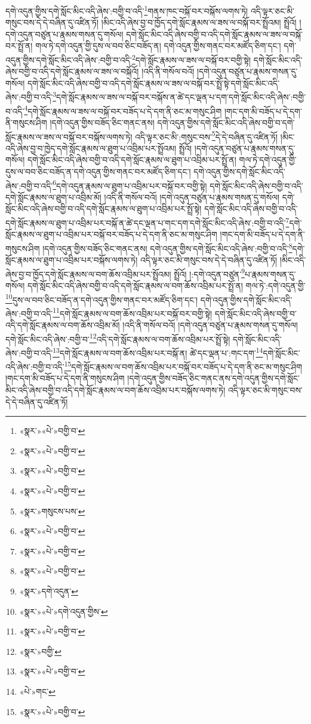 དགེ་འདུན་གྱིས་དགེ་སློང་མིང་འདི་ཞེས་:བགྱི་བ་འདི་\footnote{«སྣར་»«པེ་»བགྱི་བ་}གནས་ཁང་བསྐོ་བར་བསྐོས་ལགས་ཏེ། འདི་ལྟར་ཅང་མི་གསུང་བས་དེ་དེ་བཞིན་དུ་འཛིན་ཏོ། །མིང་འདི་ཞེས་བྱ་བ་ཁྱོད་དགེ་སློང་རྣམས་ལ་ཟས་ལ་བསྐོ་བར་སྤྲོའམ། སྤྲོའོ། །དགེ་འདུན་བཙུན་པ་རྣམས་གསན་དུ་གསོལ། དགེ་སློང་མིང་འདི་ཞེས་བགྱི་བ་འདི་དགེ་སློང་རྣམས་ལ་ཟས་ལ་བསྐོ་བར་སྤྲོ་ན། གལ་ཏེ་དགེ་འདུན་གྱི་དུས་ལ་བབ་ཅིང་བཟོད་ན། དགེ་འདུན་གྱིས་གནང་བར་མཛོད་ཅིག་དང་། དགེ་འདུན་གྱིས་དགེ་སློང་མིང་འདི་ཞེས་:བགྱི་བ་འདི་\footnote{«སྣར་»«པེ་»བགྱི་བ་}དགེ་སློང་རྣམས་ལ་ཟས་ལ་བསྐོ་བར་བགྱི་སྟེ། དགེ་སློང་མིང་འདི་ཞེས་བགྱི་བ་འདི་དགེ་སློང་རྣམས་ལ་ཟས་ལ་བསྐོའོ། །འདི་ནི་གསོལ་བའོ། །དགེ་འདུན་བཙུན་པ་རྣམས་གསན་དུ་གསོལ། དགེ་སློང་མིང་འདི་ཞེས་བགྱི་བ་འདི་དགེ་སློང་རྣམས་ལ་ཟས་ལ་བསྐོ་བར་སྤྲོ་སྟེ་དགེ་སློང་མིང་འདི་ཞེས་:བགྱི་བ་འདི་\footnote{«སྣར་»«པེ་»བགྱི་བ་}དགེ་སློང་རྣམས་ལ་ཟས་ལ་བསྐོ་བར་བསྐོས་ན་ཚེ་དང་ལྡན་པ་དག་དགེ་སློང་མིང་འདི་ཞེས་:བགྱི་བ་འདི་\footnote{«སྣར་»«པེ་»བགྱི་བ་}དགེ་སློང་རྣམས་ལ་ཟས་ལ་བསྐོ་བར་བཟོད་པ་དེ་དག་ནི་ཅང་མ་གསུང་ཤིག །གང་དག་མི་བཟོད་པ་དེ་དག་ནི་གསུངས་ཤིག །དགེ་འདུན་གྱིས་བཟོད་ཅིང་གནང་ནས། དགེ་འདུན་གྱིས་དགེ་སློང་མིང་འདི་ཞེས་བགྱི་བ་དགེ་སློང་རྣམས་ལ་ཟས་ལ་བསྐོ་བར་བསྐོས་ལགས་ཏེ། འདི་ལྟར་ཅང་མི་:གསུང་བས་\footnote{«སྣར་»གསུངས་པས་}དེ་དེ་བཞིན་དུ་འཛིན་ཏོ། །མིང་འདི་ཞེས་བྱ་བ་ཁྱེད་དགེ་སློང་རྣམས་ལ་ཐུག་པ་འབྲིམ་པར་སྤྲོའམ། སྤྲོའོ། །དགེ་འདུན་བཙུན་པ་རྣམས་གསན་དུ་གསོལ། དགེ་སློང་མིང་འདི་ཞེས་བགྱི་བ་འདི་དགེ་སློང་རྣམས་ལ་ཐུག་པ་འབྲིམ་པར་སྤྲོ་ན། གལ་ཏེ་དགེ་འདུན་གྱི་དུས་ལ་བབ་ཅིང་བཟོད་ན་དགེ་འདུན་གྱིས་གནང་བར་མཛོད་ཅིག་དང་། དགེ་འདུན་གྱིས་དགེ་སློང་མིང་འདི་ཞེས་:བགྱི་བ་འདི་\footnote{«སྣར་»«པེ་»བགྱི་བ་}དགེ་འདུན་རྣམས་ལ་ཐུག་པ་འབྲིམ་པར་བསྐོ་བར་བགྱི་སྟེ། དགེ་སློང་མིང་འདི་ཞེས་བགྱི་བ་འདི་དགེ་སློང་རྣམས་ལ་ཐུག་པ་འབྲིམ་མོ། །འདི་ནི་གསོལ་བའོ། །དགེ་འདུན་བཙུན་པ་རྣམས་གསན་དུ་གསོལ། དགེ་སློང་མིང་འདི་ཞེས་བགྱི་བ་འདི་དགེ་སློང་རྣམས་ལ་ཐུག་པ་འབྲིམ་པར་སྤྲོ་སྟེ། དགེ་སློང་མིང་འདི་ཞེས་བགྱི་བ་འདི་དགེ་སློང་རྣམས་ལ་ཐུག་པ་འབྲིམ་པར་བསྐོ་ན་ཚེ་དང་ལྡན་པ་གང་དག་དགེ་སློང་མིང་འདི་ཞེས་:བགྱི་བ་འདི་\footnote{«སྣར་»«པེ་»བགྱི་བ་}དགེ་སློང་རྣམས་ལ་ཐུག་པ་འབྲིམ་པར་བསྐོ་བར་བཟོད་པ་དེ་དག་ནི་ཅང་མ་གསུང་ཤིག །གང་དག་མི་བཟོད་པ་དེ་དག་ནི་གསུངས་ཤིག །དགེ་འདུན་གྱིས་བཟོད་ཅིང་གནང་ནས། དགེ་འདུན་གྱིས་དགེ་སློང་མིང་འདི་ཞེས་:བགྱི་བ་འདི་\footnote{«སྣར་»«པེ་»བགྱི་བ་}དགེ་སློང་རྣམས་ལ་ཐུག་པ་འབྲིམ་པར་བསྐོས་ལགས་ཏེ། འདི་ལྟར་ཅང་མི་གསུང་བས་དེ་དེ་བཞིན་དུ་འཛིན་ཏོ། །མིང་འདི་ཞེས་བྱ་བ་ཁྱོད་དགེ་སློང་རྣམས་ལ་བག་ཆོས་འབྲིམ་པར་སྤྲོའམ། སྤྲོའོ། །:དགེ་འདུན་བཙུན་\footnote{«སྣར་»དགེ་འདུན་}པ་རྣམས་གསན་དུ་གསོལ། དགེ་སློང་མིང་འདི་ཞེས་བགྱི་བ་འདི་དགེ་སློང་རྣམས་ལ་བག་ཆོས་འབྲིམ་པར་སྤྲོ་ན། གལ་ཏེ་:དགེ་འདུན་གྱི་\footnote{«སྣར་»«པེ་»དགེ་འདུན་གྱིས་}དུས་ལ་བབ་ཅིང་བཟོད་ན་དགེ་འདུན་གྱིས་གནང་བར་མཛོད་ཅིག་དང་། དགེ་འདུན་གྱིས་དགེ་སློང་མིང་འདི་ཞེས་:བགྱི་བ་འདི་\footnote{«སྣར་»«པེ་»བགྱི་བ་}དགེ་སློང་རྣམས་ལ་བག་ཆོས་འབྲིམ་པར་བསྐོ་བར་བགྱི་སྟེ། དགེ་སློང་མིང་འདི་ཞེས་བགྱི་བ་འདི་དགེ་སློང་རྣམས་ལ་བག་ཆོས་འབྲིམ་མོ། །འདི་ནི་གསོལ་བའོ། །དགེ་འདུན་བཙུན་པ་རྣམས་གསན་དུ་གསོལ། དགེ་སློང་མིང་འདི་ཞེས་:བགྱི་བ་\footnote{«སྣར་»བགྱི་}འདི་དགེ་སློང་རྣམས་ལ་བག་ཆོས་འབྲིམ་པར་སྤྲོ་སྟེ། དགེ་སློང་མིང་འདི་ཞེས་:བགྱི་བ་འདི་\footnote{«སྣར་»«པེ་»བགྱི་བ་}དགེ་སློང་རྣམས་ལ་བག་ཆོས་འབྲིམ་པར་བསྐོ་ན། ཚེ་དང་ལྡན་པ་:གང་དག་\footnote{«པེ་»གང་}དགེ་སློང་མིང་འདི་ཞེས་:བགྱི་བ་འདི་\footnote{«སྣར་»«པེ་»བགྱི་བ་}དགེ་སློང་རྣམས་ལ་བག་ཆོས་འབྲིམ་པར་བསྐོ་བར་བཟོད་པ་དེ་དག་ནི་ཅང་མ་གསུང་ཤིག །གང་དག་མི་བཟོད་པ་དེ་དག་ནི་གསུངས་ཤིག །དགེ་འདུན་གྱིས་བཟོད་ཅིང་གནང་ནས་དགེ་འདུན་གྱིས་དགེ་སློང་མིང་འདི་ཞེས་བགྱི་བ་འདི་དགེ་སློང་རྣམས་ལ་བག་ཆོས་འབྲིམ་པར་བསྐོས་ལགས་ཏེ། འདི་ལྟར་ཅང་མི་གསུང་བས་དེ་དེ་བཞིན་དུ་འཛིན་ཏོ། 